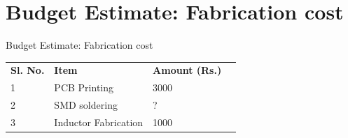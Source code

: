 \documentclass[aspectratio=169]{beamer}
\begin{document}
\section{Budget Estimate: Fabrication cost}
\begin{frame}{Budget Estimate: Fabrication cost}
\begin{table}[]
	\begin{tabular}{|l|l|l|l}
		\cline{1-3}
		\textbf{Sl. No.} & \textbf{Item}        & \textbf{Amount (Rs.)} &  \\ \cline{1-3}
		1                & PCB Printing         & 3000                    &  \\ \cline{1-3}
		2                & SMD soldering        & ?                     &  \\ \cline{1-3}
		3                & Inductor Fabrication & 1000                  &  \\ \cline{1-3}
	\end{tabular}
\end{table}
\end{frame}


%
%	
%
%

\begin{frame}


\end{frame}
\end{document}
